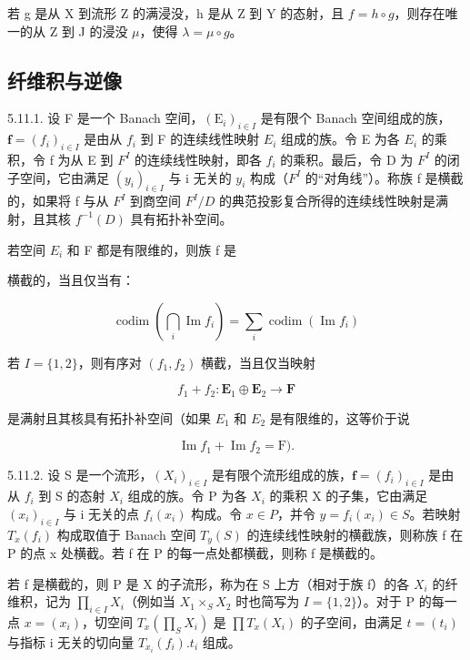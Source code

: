 若 g 是从 X 到流形 Z 的满浸没，h 是从 Z 到 Y 的态射，且 \(f = h \circ g\)，则存在唯一的从 Z 到 J 的浸没 \(\mu\)，使得 \(\lambda = \mu \circ g\)。

\subsection{纤维积与逆像}

5.11.1. 设 F 是一个 Banach 空间，\((\mathrm{E}_{i})_{i\in I}\) 是有限个 Banach 空间组成的族，\(\mathbf{f}=(f_{i})_{i\in I}\) 是由从 \(f_{i}\) 到 F 的连续线性映射 \(E_{i}\) 组成的族。令 E 为各 \(E_{i}\) 的乘积，令 f 为从 E 到 \(F^{I}\) 的连续线性映射，即各 \(f_{i}\) 的乘积。最后，令 D 为 \(F^{I}\) 的闭子空间，它由满足 \((y_{i})_{i\in I}\) 与 i 无关的 \(y_{i}\) 构成（\(F^{I}\) 的“对角线”）。称族 f 是横截的，如果将 f 与从 \(F^{I}\) 到商空间 \(F^{I}/D\) 的典范投影复合所得的连续线性映射是满射，且其核 \(f^{-1}(D)\) 具有拓扑补空间。

若空间 \(E_{i}\) 和 F 都是有限维的，则族 f 是

横截的，当且仅当有：

\[
\operatorname{codim} \left(\bigcap_ {i} \operatorname{Im} f _ {i}\right) = \sum_ {i} \operatorname{codim} \left(\operatorname{Im} f _ {i}\right)
\]

若 \(I = \{1, 2\}\)，则有序对 \((f_1, f_2)\) 横截，当且仅当映射

\[
f _ {1} + f _ {2}: \mathbf {E} _ {1} \oplus \mathbf {E} _ {2} \rightarrow \mathbf {F}
\]

是满射且其核具有拓扑补空间（如果 \(E_{1}\) 和 \(E_{2}\) 是有限维的，这等价于说

\[
\operatorname{Im} f _ {1} + \operatorname{Im} f _ {2} = \mathrm{F}).
\]

5.11.2. 设 S 是一个流形，\((X_{i})_{i\in I}\) 是有限个流形组成的族，\(\mathbf{f}=(f_{i})_{i\in I}\) 是由从 \(f_{i}\) 到 S 的态射 \(X_{i}\) 组成的族。令 P 为各 \(X_{i}\) 的乘积 X 的子集，它由满足 \((x_{i})_{i\in I}\) 与 i 无关的点 \(f_{i}(x_{i})\) 构成。令 \(x\in P\)，并令 \(y=f_{i}(x_{i})\in S\)。若映射 \(T_{x}(f_{i})\) 构成取值于 Banach 空间 \(T_{y}(S)\) 的连续线性映射的横截族，则称族 f 在 P 的点 x 处横截。若 f 在 P 的每一点处都横截，则称 f 是横截的。

若 f 是横截的，则 P 是 X 的子流形，称为在 S 上方（相对于族 f）的各 \(X_{i}\) 的纤维积，记为 \(\prod_{i\in I}X_{i}\)（例如当 \(X_{1}\times_{S}X_{2}\) 时也简写为 \(I=\{1,2\}\)）。对于 P 的每一点 \(x=(x_{i})\)，切空间 \(T_{x}(\prod_{S}X_{i})\) 是 \(\prod T_{x}(X_{i})\) 的子空间，由满足 \(t=(t_{i})\) 与指标 i 无关的切向量 \(T_{x_{i}}(f_{i}).t_{i}\) 组成。

